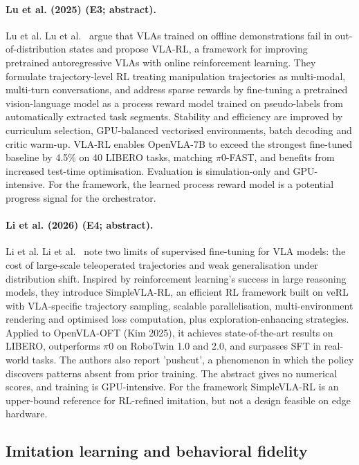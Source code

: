 \documentclass[10pt,a4paper]{article}
\begin{document}
\paragraph{Lu et al. (2025) (E3; abstract).} Lu et al. Lu et al.~\cite{Lu2025} argue that VLAs trained on offline demonstrations fail in out-of-distribution states and propose VLA-RL, a framework for improving pretrained autoregressive VLAs with online reinforcement learning. They formulate trajectory-level RL treating manipulation trajectories as multi-modal, multi-turn conversations, and address sparse rewards by fine-tuning a pretrained vision-language model as a process reward model trained on pseudo-labels from automatically extracted task segments. Stability and efficiency are improved by curriculum selection, GPU-balanced vectorised environments, batch decoding and critic warm-up. VLA-RL enables OpenVLA-7B to exceed the strongest fine-tuned baseline by 4.5\% on 40 LIBERO tasks, matching $\pi$0-FAST, and benefits from increased test-time optimisation. Evaluation is simulation-only and GPU-intensive. For the framework, the learned process reward model is a potential progress signal for the orchestrator.

\paragraph{Li et al. (2026) (E4; abstract).} Li et al. Li et al.~\cite{Li2026} note two limits of supervised fine-tuning for VLA models: the cost of large-scale teleoperated trajectories and weak generalisation under distribution shift. Inspired by reinforcement learning's success in large reasoning models, they introduce SimpleVLA-RL, an efficient RL framework built on veRL with VLA-specific trajectory sampling, scalable parallelisation, multi-environment rendering and optimised loss computation, plus exploration-enhancing strategies. Applied to OpenVLA-OFT (Kim 2025), it achieves state-of-the-art results on LIBERO, outperforms $\pi$0 on RoboTwin 1.0 and 2.0, and surpasses SFT in real-world tasks. The authors also report 'pushcut', a phenomenon in which the policy discovers patterns absent from prior training. The abstract gives no numerical scores, and training is GPU-intensive. For the framework SimpleVLA-RL is an upper-bound reference for RL-refined imitation, but not a design feasible on edge hardware.

\subsection*{Imitation learning and behavioral fidelity}
\end{document}
